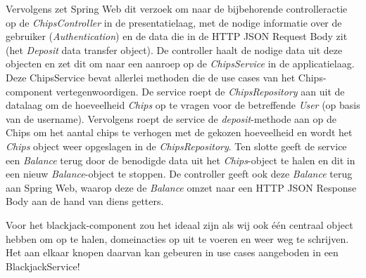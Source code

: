 Vervolgens zet Spring Web dit verzoek om naar de bijbehorende 
controlleractie op de \emph{ChipsController} in de presentatielaag, met de
nodige informatie over de gebruiker (\emph{Authentication}) en de data die 
in de HTTP JSON Request Body zit (het \emph{Deposit} data transfer object).
De controller haalt de nodige data uit deze objecten en zet dit om naar 
een aanroep op de \emph{ChipsService} in de applicatielaag. 
Deze ChipsService bevat allerlei methoden die de use cases van 
het Chips-component vertegenwoordigen.
De service roept de \emph{ChipsRepository} aan uit de datalaag om de hoeveelheid
\emph{Chips} op te vragen voor de betreffende \emph{User} (op basis van de username). 
Vervolgens roept de service de \emph{deposit}-methode aan op de Chips om het aantal chips te verhogen met de 
gekozen hoeveelheid en wordt het \emph{Chips} object weer opgeslagen in de \emph{ChipsRepository}.
Ten slotte geeft de service een \emph{Balance} terug door de benodigde data uit het 
\emph{Chips}-object te halen en dit in een nieuw \emph{Balance}-object te stoppen.
De controller geeft ook deze \emph{Balance} terug aan Spring Web, waarop deze de 
\emph{Balance} omzet naar een HTTP JSON Response Body aan de hand van diens getters.

Voor het blackjack-component zou het ideaal zijn als wij ook één centraal object hebben 
om op te halen, domeinacties op uit te voeren en weer weg te schrijven. Het aan elkaar 
knopen daarvan kan gebeuren in use cases aangeboden in een BlackjackService!